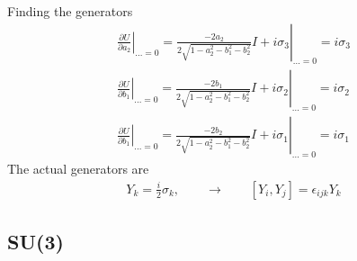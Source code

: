 \documentclass[10pt,a4paper]{book}
\theoremstyle{definition}
\begin{document}
Finding the generators
\begin{align*}
\left.\frac{\partial U}{\partial a_2}\right|_{...=0}=\left.\frac{-2a_2}{2\sqrt{1-a_2^2-b_1^2-b_2^2}}I+i\sigma_3\right|_{...=0}=i\sigma_3\\
\left.\frac{\partial U}{\partial b_1}\right|_{...=0}=\left.\frac{-2b_1}{2\sqrt{1-a_2^2-b_1^2-b_2^2}}I+i\sigma_2\right|_{...=0}=i\sigma_2\\
\left.\frac{\partial U}{\partial b_1}\right|_{...=0}=\left.\frac{-2b_2}{2\sqrt{1-a_2^2-b_1^2-b_2^2}}I+i\sigma_1\right|_{...=0}=i\sigma_1
\end{align*}
The actual generators are
\begin{align*}
Y_k=\frac{i}{2}\sigma_k,\qquad\rightarrow\qquad[Y_i,Y_j]=\epsilon_{ijk}Y_k
\end{align*}

\subsection{SU(3)}
\end{document}
